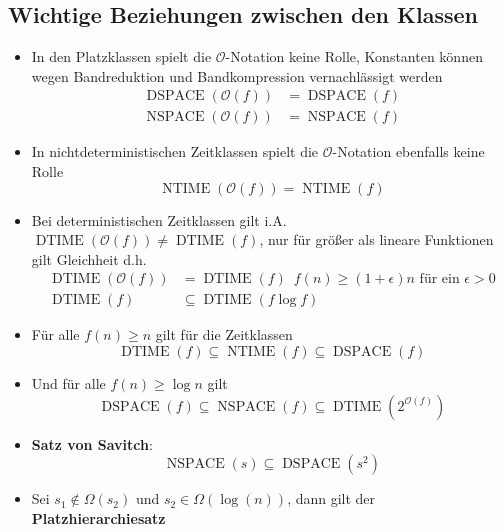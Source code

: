 \subsection{Wichtige Beziehungen zwischen den Klassen}
\begin{itemize}
	\item In den Platzklassen spielt die $\mathcal O$-Notation keine Rolle, Konstanten können wegen Bandreduktion und Bandkompression vernachlässigt werden
	\begin{align*}
		\operatorname{DSPACE}(\mathcal O(f))&=\operatorname{DSPACE}(f)\\
		\operatorname{NSPACE}(\mathcal O(f))&=\operatorname{NSPACE}(f)
	\end{align*}
	\item In nichtdeterministischen Zeitklassen spielt die $\mathcal O$-Notation ebenfalls keine Rolle
	\begin{equation*}
		\operatorname{NTIME}(\mathcal O(f))=\operatorname{NTIME}(f)
	\end{equation*}
	\item Bei deterministischen Zeitklassen gilt i.A. $\operatorname{DTIME}(\mathcal O(f))\not=\operatorname{DTIME}(f)$, nur für größer als lineare Funktionen gilt Gleichheit d.h.
	\begin{align*}
		\operatorname{DTIME}(\mathcal O(f))&=\operatorname{DTIME}(f) \enspace f(n)\geq (1+\epsilon)n\text{ für ein }\epsilon>0\\
		\operatorname{DTIME}(f)&\subseteq \operatorname{DTIME}(f\log f)
	\end{align*}
	\item Für alle $f(n)\geq n$ gilt für die Zeitklassen
	\begin{equation*}
		\operatorname{DTIME}(f)\subseteq\operatorname{NTIME}(f)\subseteq\operatorname{DSPACE}(f)
	\end{equation*}
	\item Und für alle $f(n)\geq \log n$ gilt
	\begin{equation*}
		\operatorname{DSPACE}(f)\subseteq\operatorname{NSPACE}(f)\subseteq\operatorname{DTIME}(2^{\mathcal O(f)})
	\end{equation*}
	\item \textbf{Satz von Savitch}:
	\begin{equation*}
		\operatorname{NSPACE}(s)\subseteq\operatorname{DSPACE}(s^2)
	\end{equation*}
	\item Sei $s_1\not\in\Omega(s_2)$ und $s_2\in\Omega(\log(n))$, dann gilt der \textbf{Platzhierarchiesatz}

\end{itemize}
